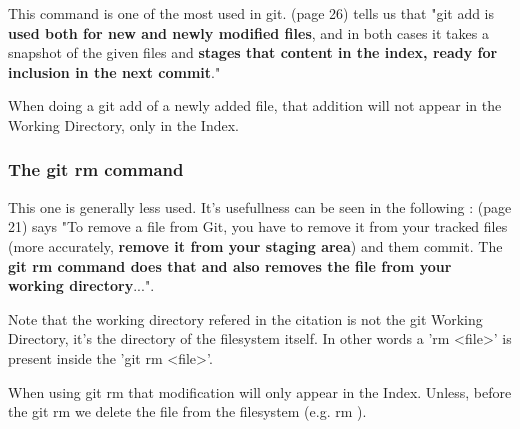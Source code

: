 This command is one of the most used in git. \cite{gitComm} (page 26)
tells us that
"git add is {\bf used both for new and newly modified files},
and in both cases it takes a snapshot of the given files
and {\bf stages that content in the index, ready for inclusion
in the next commit}." \par 
When doing a git add of a newly
added file, that
addition will not appear in the Working Directory, only in the
Index. 
\subsubsection{The git rm command}

This one is generally less used. It's usefullness can be
seen in the following : \cite{Chacon:2009:PG:1618548}
(page 21) says "To remove a file from Git, you have to remove it
from your tracked files (more accurately, {\bf remove it from your
staging area}) and them commit. The {\bf git rm command does that
and also removes the file from your working directory}...". \par
Note that the working directory refered in the citation is not
the git Working Directory, it's the directory of the filesystem itself.
In other words a 'rm <file>' is present inside the 'git rm <file>'. \par
When using git rm
that modification will only appear in the Index. Unless, before
the git rm we delete the file from the filesystem (e.g. rm ). \par

